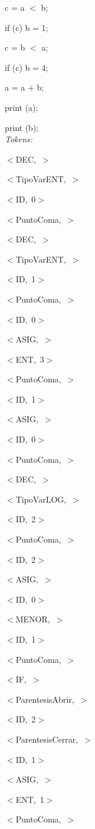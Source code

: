 \documentclass[a4paper, 12pt]{article}
\begin{document}
c = a  $<$  b;

if (c) b  =  1;

c = b  $<$  a;

if (c) b  =  4;

 a = a  +  b;
 
print (a);

print (b);\medskip \\
\emph{Tokens:}

\mbox{$<$DEC, $>$ }


\mbox{$<$TipoVarENT, $>$} 


\mbox{$<$ID, 0$>$ }


\mbox{$<$PuntoComa, $>$} 


\mbox{$<$DEC, $>$}


\mbox{$<$TipoVarENT, $>$ }


\mbox{$<$ID, 1$>$ }


\mbox{$<$PuntoComa, $>$ }


\mbox{$<$ID, 0$>$ }


\mbox{$<$ASIG, $>$ }


\mbox{$<$ENT, 3$>$ }


\mbox{$<$PuntoComa, $>$ }


\mbox{$<$ID, 1$>$ }


\mbox{$<$ASIG, $>$ }


\mbox{$<$ID, 0$>$} 


\mbox{$<$PuntoComa, $>$ }


\mbox{$<$DEC, $>$ }


\mbox{$<$TipoVarLOG, $>$ }


\mbox{$<$ID, 2$>$ }


\mbox{$<$PuntoComa, $>$ }


\mbox{$<$ID, 2$>$ }


\mbox{$<$ASIG, $>$ }


\mbox{$<$ID, 0$>$ }


\mbox{$<$MENOR, $>$ }


\mbox{$<$ID, 1$>$ }


\mbox{$<$PuntoComa, $>$ }


\mbox{$<$IF, $>$ }


\mbox{$<$ParentesisAbrir, $>$ }


\mbox{$<$ID, 2$>$ }


\mbox{$<$ParentesisCerrar, $>$} 


\mbox{$<$ID, 1$>$} 


\mbox{$<$ASIG, $>$ }


\mbox{$<$ENT, 1$>$ }


\mbox{$<$PuntoComa, $>$ }
\end{document}
